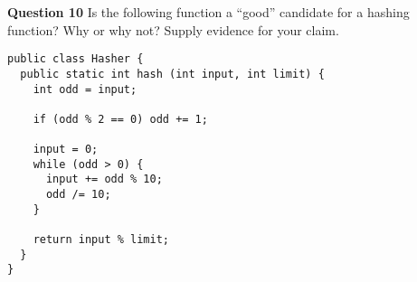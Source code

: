 \documentclass{letter}
\begin{document}
\clearpage

{\bf Question 10} \kern 1cm Is the following function a ``good'' candidate for
a hashing function?  Why or why not?  Supply evidence for your claim.

\begin{verbatim}
public class Hasher {
  public static int hash (int input, int limit) {
    int odd = input;

    if (odd % 2 == 0) odd += 1;

    input = 0;
    while (odd > 0) {
      input += odd % 10;
      odd /= 10;
    }

    return input % limit;
  }
}
\end{verbatim}
\end{document}
